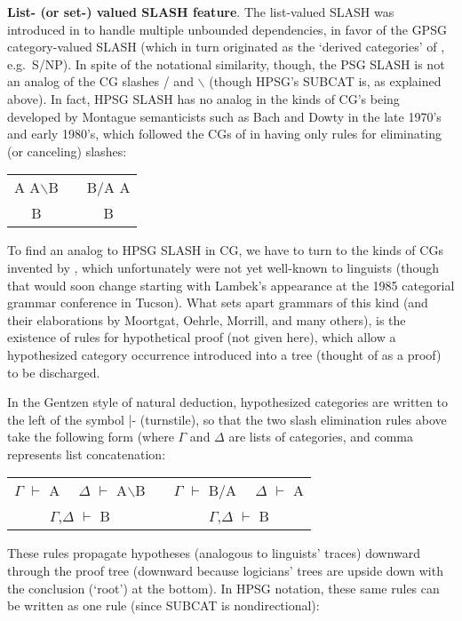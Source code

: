 \documentclass[output=paper]{langsci/langscibook}
\begin{document}
\noindent
{\bf List- (or set-) valued SLASH feature}. The list-valued SLASH was introduced in \citet{Pollard85a-u} to handle multiple unbounded dependencies, in favor of the GPSG category-valued SLASH (which in turn originated as the `derived categories' of  \citet{Gazdar81}, e.g.~S/NP). In spite of the notational similarity, though, the PSG SLASH is not an analog of the CG slashes / and $\backslash$ (though HPSG's SUBCAT is, as
explained above). In fact, HPSG SLASH has no analog in the kinds of CG's being developed by Montague semanticists such as Bach and Dowty in the late 1970's and early 1980's, which followed the CGs of \citet{Bar-Hillel54-u-kopiert} in having only rules for eliminating (or canceling) slashes:

\begin{center}
\begin{tabular}{ccc}
A A$\backslash$B  & &     B/A A \\ \cline{1-1} \cline{3-3}
B & & B 
\end{tabular}
\end{center}

\noindent
To find an analog to HPSG SLASH in CG, we have to turn to the kinds of CGs invented by \citet{Lambek1958}, which unfortunately were not yet well-known to linguists (though that would soon change starting with Lambek's appearance at the 1985 categorial grammar conference in Tucson). What sets apart grammars 
of this kind (and their elaborations by Moortgat, Oehrle, Morrill, and many others), is the existence of rules for hypothetical proof (not given here), which allow a hypothesized category occurrence introduced into a tree (thought of as a proof) to be discharged. 

In the Gentzen style of natural deduction, hypothesized categories are written to the left of the symbol |- (turnstile), so that the two slash elimination rules above take the following form (where $\Gamma$ and $\Delta$ are  lists of categories, and comma represents list concatenation:

\begin{center}
\begin{tabular}{ccc}
$\Gamma$ $\vdash$ A \ \ $\Delta$ $\vdash$ A$\backslash$B  & &     $\Gamma$ $\vdash$ B/A \ \ $\Delta$ $\vdash$ A \\ \cline{1-1} \cline{3-3}
$\Gamma$,$\Delta$ $\vdash$ B & & $\Gamma$,$\Delta$ $\vdash$ B 
\end{tabular}
\end{center}

\noindent
These rules propagate hypotheses (analogous to linguists' traces) downward through the proof tree (downward because logicians' trees are
upside down with the conclusion (`root') at the bottom). In HPSG notation, these same rules can be written as one rule (since SUBCAT is
nondirectional):
\end{document}
